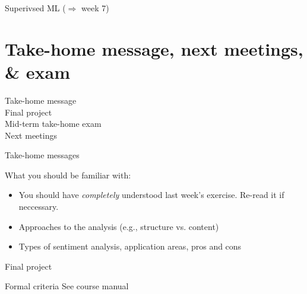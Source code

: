 \documentclass{beamer}
\begin{document}
\begin{frame}{Superivsed ML ($\Rightarrow$ week 7)}
\section[Next meetings]{Take-home message, next meetings, \& exam}
\begin{frame}
  Take-home message\\
  Final project\\
Mid-term take-home exam\\
Next meetings
\end{frame}



\begin{frame}{Take-home messages}
\begin{block}{What you should be familiar with:}
\begin{itemize}
\item You should have \emph{completely} understood last week's exercise. Re-read it if neccessary.
\item Approaches to the analysis (e.g., structure vs. content)
\item Types of sentiment analysis, application areas, pros and cons
\end{itemize}
\end{block}
\end{frame}

\begin{frame}{Final project}
  \begin{block}{Formal criteria}
See course manual
    \end{block}


\end{frame}
\end{frame}
\end{document}
